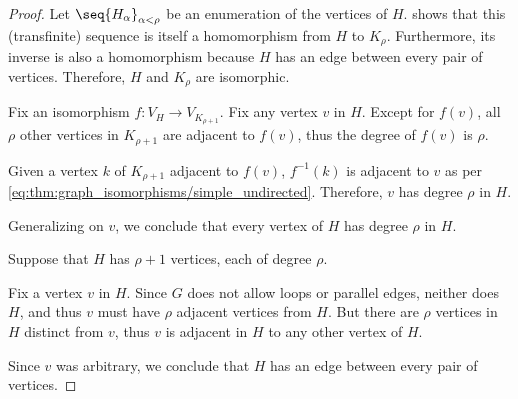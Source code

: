 \begin{proof}
   Let \( \seq{ H_\alpha }_{\alpha < \rho} \) be an enumeration of the vertices of \( H \).  shows that this (transfinite) sequence is itself a homomorphism from \( H \) to \( K_\rho \). Furthermore, its inverse is also a homomorphism because \( H \) has an edge between every pair of vertices. Therefore, \( H \) and \( K_\rho \) are isomorphic.

   Fix an isomorphism \( f: V_H \to V_{K_{\rho + 1}} \). Fix any vertex \( v \) in \( H \). Except for \( f(v) \), all \( \rho \) other vertices in \( K_{\rho + 1} \) are adjacent to \( f(v) \), thus the degree of \( f(v) \) is \( \rho \).

  Given a vertex \( k \) of \( K_{\rho + 1} \) adjacent to \( f(v) \), \( f^{-1}(k) \) is adjacent to \( v \) as per \eqref{eq:thm:graph_isomorphisms/simple_undirected}. Therefore, \( v \) has degree \( \rho \) in \( H \).

  Generalizing on \( v \), we conclude that every vertex of \( H \) has degree \( \rho \) in \( H \).

   Suppose that \( H \) has \( \rho + 1 \) vertices, each of degree \( \rho \).

  Fix a vertex \( v \) in \( H \). Since \( G \) does not allow loops or parallel edges, neither does \( H \), and thus \( v \) must have \( \rho \) adjacent vertices from \( H \). But there are \( \rho \) vertices in \( H \) distinct from \( v \), thus \( v \) is adjacent in \( H \) to any other vertex of \( H \).

  Since \( v \) was arbitrary, we conclude that \( H \) has an edge between every pair of vertices.
\end{proof}

